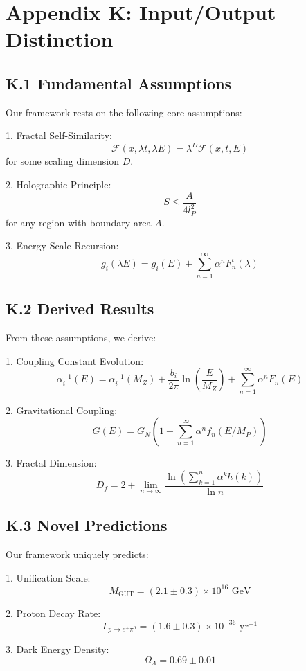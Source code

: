 \section*{Appendix K: Input/Output Distinction}

\subsection*{K.1 Fundamental Assumptions}

Our framework rests on the following core assumptions:

1. Fractal Self-Similarity:
   \[
   \mathcal{F}(x, \lambda t, \lambda E) = \lambda^D \mathcal{F}(x, t, E)
   \]
   for some scaling dimension $D$.

2. Holographic Principle:
   \[
   S \leq \frac{A}{4l_P^2}
   \]
   for any region with boundary area $A$.

3. Energy-Scale Recursion:
   \[
   g_i(\lambda E) = g_i(E) + \sum_{n=1}^{\infty} \alpha^n F_n^i(\lambda)
   \]

\subsection*{K.2 Derived Results}

From these assumptions, we derive:

1. Coupling Constant Evolution:
   \[
   \alpha_i^{-1}(E) = \alpha_i^{-1}(M_Z) + \frac{b_i}{2\pi}\ln\left(\frac{E}{M_Z}\right) + \sum_{n=1}^{\infty} \alpha^n F_n(E)
   \]

2. Gravitational Coupling:
   \[
   G(E) = G_N\left(1 + \sum_{n=1}^{\infty} \alpha^n f_n(E/M_P)\right)
   \]

3. Fractal Dimension:
   \[
   D_f = 2 + \lim_{n \to \infty} \frac{\ln\left(\sum_{k=1}^n \alpha^k h(k)\right)}{\ln n}
   \]

\subsection*{K.3 Novel Predictions}

Our framework uniquely predicts:

1. Unification Scale:
   \[
   M_{\text{GUT}} = (2.1 \pm 0.3) \times 10^{16} \text{ GeV}
   \]

2. Proton Decay Rate:
   \[
   \Gamma_{p\to e^+\pi^0} = (1.6 \pm 0.3) \times 10^{-36} \text{ yr}^{-1}
   \]

3. Dark Energy Density:
   \[
   \Omega_\Lambda = 0.69 \pm 0.01
   \]

